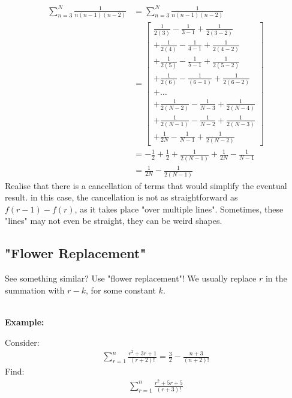 \documentclass[12pt, a4paper, titlepage]{article}
\begin{document}
\begin{align*}
    \sum^N_{n = 3} \frac{1}{n(n - 1)(n - 2)} &= \sum^N_{n = 3} \frac{1}{n(n - 1)(n - 2)} \\
    &= \left[
    \begin{array}{c}
         \frac{1}{2(3)} - \frac{1}{3 - 1} + \frac{1}{2(3 - 2)} \\
        + \frac{1}{2(4)} - \frac{1}{4 - 1} + \frac{1}{2(4 - 2)} \\
        + \frac{1}{2(5)} - \frac{1}{5 - 1} + \frac{1}{2(5 - 2)} \\
        + \frac{1}{2(6)} - \frac{1}{(6 - 1)} + \frac{1}{2(6 - 2)} \\
        + \dots \\
        + \frac{1}{2(N - 2)} - \frac{1}{N - 3} + \frac{1}{2(N - 4)} \\
        + \frac{1}{2(N - 1)} - \frac{1}{N - 2} + \frac{1}{2(N - 3)} \\
        + \frac{1}{2N} - \frac{1}{N - 1} + \frac{1}{2(N - 2)}
    \end{array}
    \right] \\
    &= -\frac{1}{2} + \frac{1}{2} + \frac{1}{2(N - 1)} + \frac{1}{2N} - \frac{1}{N - 1} \\
    &= \frac{1}{2N} - \frac{1}{2(N - 1)}
\end{align*}
Realise that there is a cancellation of terms that would simplify the eventual result. in this case, the cancellation is not as straightforward as $f(r - 1) - f(r)$, as it takes place "over multiple lines". Sometimes, these "lines" may not even be straight, they can be weird shapes.

\subsection{"Flower Replacement"}

See something similar? Use "flower replacement"! We usually replace $r$ in the summation with $r - k$, for some constant $k$.

\textbf{\\ Example:}

Consider:
\begin{align*}
    \sum^n_{r = 1} \frac{r^2 + 3r + 1}{(r + 2)!} = \frac{3}{2} - \frac{n + 3}{(n + 2)!}
\end{align*}
Find:
\begin{align*}
    \sum^n_{r = 1} \frac{r^2 + 5r + 5}{(r + 3)!}
\end{align*}
\end{document}
